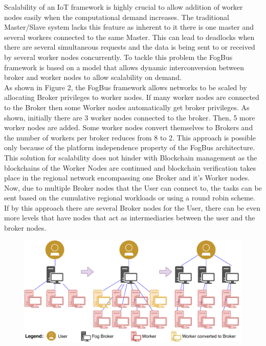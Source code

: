 \documentclass[10pt,journal,compsoc]{IEEEtran}
\begin{document}
Scalability of an IoT framework is highly crucial to allow addition of worker nodes easily when the computational demand increases. The traditional Master/Slave system lacks this feature as inherent to it there is one master and several workers connected to the same Master. This can lead to deadlocks when there are several simultaneous requests and the data is being sent to or received by several worker nodes concurrently. To tackle this problem the FogBus framework is based on a model that allows dynamic interconversion between broker and worker nodes to allow scalability on demand. \\
As shown in Figure 2, the FogBus framework allows networks to be scaled by allocating Broker privileges to worker nodes. If many worker nodes are connected to the Broker then some Worker nodes automatically get broker privileges. As shown, initially there are 3 worker nodes connected to the broker. Then, 5 more worker nodes are added. Some worker nodes convert themselves to Brokers and the number of workers per broker reduces from 8 to 2. This approach is possible only because of the platform independence property of the FogBus architecture. \\
This solution for scalability does not hinder with Blockchain management as the blockchains of the Worker Nodes are continued and blockchain verification takes place in the regional network encompassing one Broker and it's Worker nodes. Now, due to multiple Broker nodes that the User can connect to, the tasks can be sent based on the cumulative regional workloads or using a round robin scheme. If by this approach there are several Broker nodes for the User, there can be even more levels that have nodes that act as intermediaries between the user and the broker nodes.

\begin{figure}[h]
\centering
\includegraphics[width=15cm]{scalability}
\end{figure}
\end{document}
